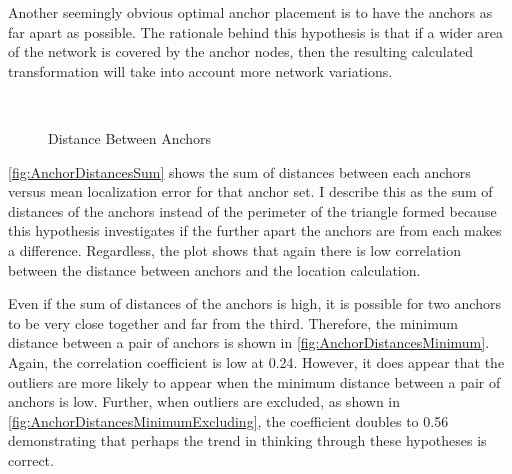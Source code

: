 Another seemingly obvious optimal anchor placement is to have the anchors as far apart as possible.  The rationale behind this hypothesis is that if a wider area of the network is covered by the anchor nodes, then the resulting calculated transformation will take into account more network variations.  

\begin{figure}
  \centering
		\\
    \label{fig:AnchorDistances}
	\caption{Distance Between Anchors}
\end{figure}

\ref{fig:AnchorDistancesSum} shows the sum of distances between each anchors versus mean localization error for that anchor set. I describe this as the sum of distances of the anchors instead of the perimeter of the triangle formed because this hypothesis investigates if the further apart the anchors are from each makes a difference. Regardless, the plot shows that again there is low correlation between the distance between anchors and the location calculation.  

Even if the sum of distances of the anchors is high, it is possible for two anchors to be very close together and far from the third.  Therefore, the minimum distance between a pair of anchors is shown in \ref{fig:AnchorDistancesMinimum}.  Again, the correlation coefficient is low at 0.24.  However, it does appear that the outliers are more likely to appear when the minimum distance between a pair of anchors is low.  Further, when outliers are excluded, as shown in \ref{fig:AnchorDistancesMinimumExcluding}, the coefficient doubles to 0.56 demonstrating that perhaps the trend in thinking through these hypotheses is correct.

